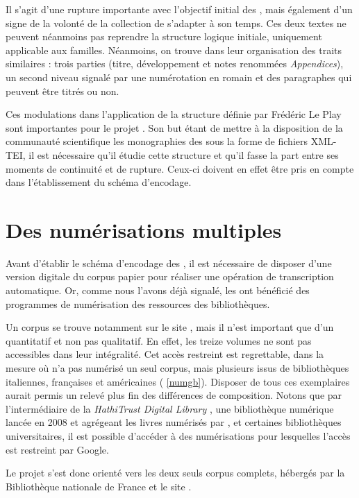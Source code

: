 Il s'agit d'une rupture importante avec l'objectif initial des \odm, mais également d'un signe de la volonté de la collection de s'adapter à son temps. Ces deux textes ne peuvent néanmoins pas reprendre la structure logique initiale, uniquement applicable aux familles. Néanmoins, on trouve dans leur organisation des traits similaires : trois parties (titre, développement et notes renommées \textit{Appendices}), un second niveau signalé par une numérotation en romain et des paragraphes qui peuvent être titrés ou non.

Ces modulations dans l'application de la structure définie par Frédéric Le Play sont importantes pour le projet \timeus. Son but étant de mettre à la disposition de la communauté scientifique les monographies des \odm{} sous la forme de fichiers XML-TEI, il est nécessaire qu'il étudie cette structure et qu'il fasse la part entre ses moments de continuité et de rupture. Ceux-ci doivent en effet être pris en compte dans l'établissement du schéma d'encodage.

\chapter{Des numérisations multiples}

Avant d'établir le schéma d'encodage des \odm, il est nécessaire de disposer d'une version digitale du corpus \og papier \fg{} pour réaliser une opération de transcription automatique. Or, comme nous l'avons déjà signalé, les \odm{} ont bénéficié des programmes de numérisation des ressources des bibliothèques.

Un corpus se trouve notamment sur le site \gb, mais il n'est important que d'un \pov{} quantitatif et non pas qualitatif. En effet, les treize volumes ne sont pas accessibles dans leur intégralité. Cet accès restreint est regrettable, dans la mesure où \gb{} n'a pas numérisé un seul corpus, mais plusieurs issus de bibliothèques italiennes, françaises et américaines (\ann{} \ref{numgb}). Disposer de tous ces exemplaires aurait permis un relevé plus fin des différences de composition. Notons que par l'intermédiaire de la \textit{HathiTrust Digital Library }, une bibliothèque numérique lancée en 2008 et agrégeant les livres numérisés par \gb, \ia{} et certaines bibliothèques universitaires, il est possible d'accéder à des numérisations pour lesquelles l'accès est restreint par Google.

Le projet \timeus{} s'est donc orienté vers les deux seuls corpus complets, hébergés par la Bibliothèque nationale de France et le site \ia.

